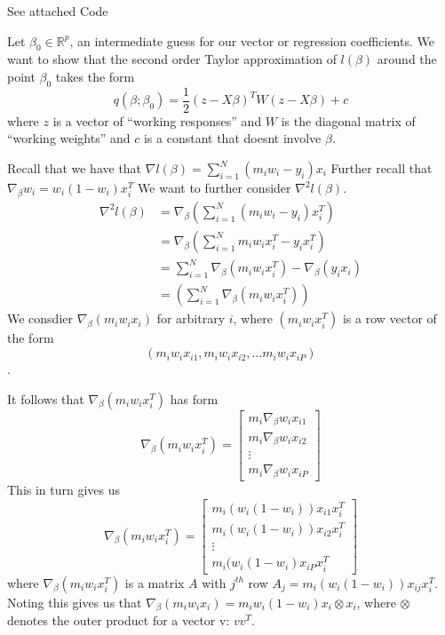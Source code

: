 \documentclass[12pt]{article}
\newcommand{\R}{\mathbb{R}}
\newenvironment{problem}[2][Exercise]{\begin{trivlist}
\item[\hskip \labelsep {\bfseries #1}\hskip \labelsep {\bfseries #2.}]}{\end{trivlist}}
\begin{document}
\begin{problem}{B}
See attached Code
\end{problem}

\begin{problem}{C}
Let $\beta_0 \in \R^p$, an intermediate guess for our vector or regression coefficients.
We want to show that the second order Taylor approximation of $l(\beta)$ around the point $\beta_0$ takes the form
$$q(\beta;\beta_0) = \frac{1}{2}(z - X\beta)^TW(z-X\beta) + c$$
where $z$ is a vector of ``working responses'' and $W$ is the diagonal matrix of ``working weights'' and $c$ is a constant that doesnt involve $\beta$.

Recall that we have that $\nabla l(\beta) = \sum_{i=1}^N(m_iw_i - y_i)x_i$
Further recall that $\nabla_\beta w_i = w_i(1-w_i)x_i^T$
We want to further consider $\nabla^2 l(\beta)$.
\begin{align*}
\nabla^2 l(\beta) &= \nabla_\beta \left( \sum_{i=1}^N(m_iw_i - y_i)x_i^T \right)\\
&= \nabla_\beta \left( \sum_{i=1}^Nm_iw_ix_i^T - y_ix_i^T \right)\\
&=  \sum_{i=1}^N\nabla_\beta(m_iw_ix_i^T) - \nabla_\beta(y_ix_i)\\
&= \left(\sum_{i=1}^N \nabla_\beta(m_iw_ix_i^T)\right)
\end{align*}
We consdier $\nabla_\beta(m_iw_ix_i)$ for arbitrary $i$, where $(m_iw_ix_i^T)$ is a row vector of the form $$(m_iw_ix_{i1}, m_iw_ix_{i2}, \ldots m_iw_ix_{iP})$$.

It follows that $\nabla_\beta(m_iw_ix_i^T)$ has form
$$\nabla_\beta(m_iw_ix_i^T) = \left[\begin{array}{c} m_i \nabla_\beta w_i x_{i1} \\ m_i \nabla_\beta w_i x_{i2} \\ \vdots \\ m_i \nabla_\beta w_i x_{iP} \end{array}\right]$$
This in turn gives us
$$\nabla_\beta(m_iw_ix_i^T) = \left[\begin{array}{c} m_i (w_i(1-w_i)) x_{i1}x_i^T \\ m_i  (w_i(1-w_i)) x_{i2}x_i^T \\ \vdots \\ m_i (w_i(1-w_i) x_{iP}x_i^T \end{array}\right]$$
where $\nabla_\beta(m_iw_ix_i^T)$ is a matrix $A$ with $j^{th}$ row $A_j = m_i (w_i(1-w_i)) x_{ij}x_i^T$.
Noting this gives us that $\nabla_\beta(m_iw_ix_i) = m_iw_i(1-w_i)x_i \otimes x_i$, where $\otimes$ denotes the outer product for a vector v: $vv^T$.\


\end{problem}
\end{document}
